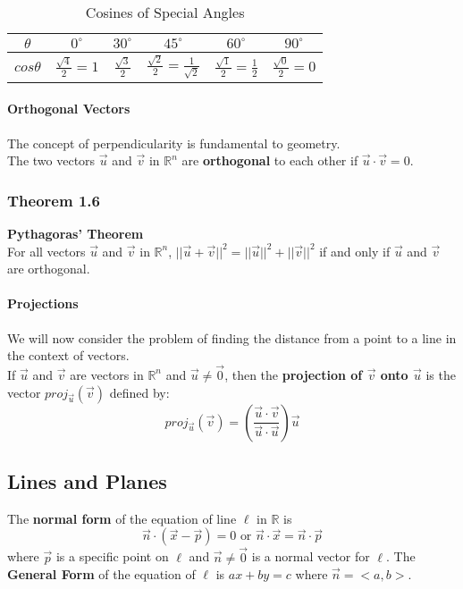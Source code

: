 \documentclass{article}
\newcommand{\p}[1]{\paragraph{#1}} %
\begin{document}
		\begin{table}[!htb]
		\centering
		\begin{tabular}{ | c | c | c | c | c | c | } \hline
			$\theta$ & $0^{\circ}$ & $30^{\circ}$ & $45^{\circ}$ & $60^{\circ}$ & $90^{\circ}$ \\ 
			\hline
			$cos\theta$ & $\frac{\sqrt{4}}{2}=1$ & $\frac{\sqrt{3}}{2}$ & $\frac{\sqrt{2}}{2} = 
			\frac{1}{\sqrt{2}}$ & $\frac{\sqrt{1}}{2} = \frac{1}{2}$ & $\frac{\sqrt{0}}{2} = 0$ \\ \hline
		\end{tabular}
		\caption{Cosines of Special Angles}
		\label{tab:spec_angles}
		\end{table}
	
	\p{Orthogonal Vectors} The concept of perpendicularity is fundamental to geometry. \\
	The two vectors $\vec{u}$ and $\vec{v}$ in $\mathbb{R}^n$ are \textbf{orthogonal} to each 
	other if $\vec{u}\cdot\vec{v}=0$.
	
		\subsubsection{Theorem 1.6}
		\textbf{Pythagoras' Theorem} \\
		For all vectors $\vec{u}$ and $\vec{v}$ in $\mathbb{R}^n$, $||\vec{u}+\vec{v}||^2 = ||
		\vec{u}||^2 + ||\vec{v}||^2$ if and only if $\vec{u}$ and $\vec{v}$ are orthogonal.
		
	\p{Projections}
	We will now consider the problem of finding the distance from a point to a line in the context of 
	vectors. \\
	If $\vec{u}$ and $\vec{v}$ are vectors in $\mathbb{R}^n$ and $\vec{u}\neq\vec{0}$, then the 
	\textbf{projection of $\vec{v}$ onto $\vec{u}$} is the vector $proj_{\vec{u}}(\vec{v})$ defined by:
	\[ proj_{\vec{u}}(\vec{v}) = \left(\frac{\vec{u}\cdot\vec{v}}{\vec{u}\cdot\vec{u}}\right)\vec{u} \]
	
	\subsection{Lines and Planes}
	The \textbf{normal form} of the equation of line $\ell$ in $\mathbb{R}$ is
	\[ \vec{n}\cdot(\vec{x}-\vec{p}) = 0 \text{ or } \vec{n}\cdot\vec{x} = \vec{n}\cdot\vec{p} \]
	where $\vec{p}$ is a specific point on $\ell$ and $\vec{n}\neq\vec{0}$ is a normal vector for $\ell
	$. The \textbf{General Form} of the equation of $\ell$ is $ax+by=c$ where $\vec{n}=<a,b>$.
	
\end{document}
